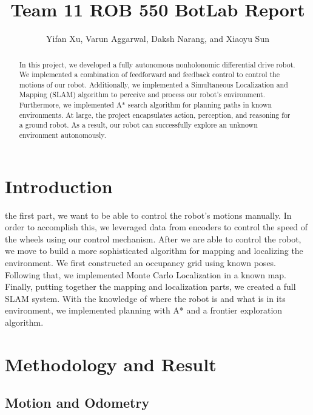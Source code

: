 \documentclass[journal]{IEEEtran}
\begin{document}
\title{%
  Team 11 ROB 550 BotLab Report \\
  }
    
\author{Yifan Xu,
Varun Aggarwal, Daksh Narang, and Xiaoyu Sun}

\maketitle

\begin{abstract}
In this project, we developed a fully autonomous nonholonomic differential drive robot. We implemented a combination of feedforward and feedback control to control the motions of our robot. Additionally, we implemented a Simultaneous Localization and Mapping (SLAM) algorithm to perceive and process our robot's environment. Furthermore, we implemented A* search algorithm for planning paths in known environments. At large, the project encapsulates action, perception, and reasoning for a ground robot. As a result, our robot can successfully explore an unknown environment autonomously.

\end{abstract}

\IEEEpeerreviewmaketitle

\section{Introduction}
 the first part, we want to be able to control the robot's motions manually. In order to accomplish this, we leveraged data from encoders to control the speed of the wheels using our control mechanism. After we are able to control the robot, we move to build a more sophisticated algorithm for mapping and localizing the environment. We first constructed an occupancy grid using known poses. Following that, we implemented Monte Carlo Localization in a known map. Finally, putting together the mapping and localization parts, we created a full SLAM system. With the knowledge of where the robot is and what is in its environment, we implemented planning with A* and a frontier exploration algorithm.

\section{Methodology and Result}
\subsection{Motion and Odometry}
\end{document}
